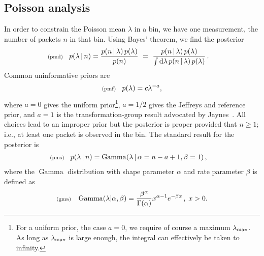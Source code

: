 \documentclass[11pt]{article}
\newcommand{\lleq}[1]{\label{#1} }
\renewcommand{\lleq}[1]{\label{#1} {\scriptstyle {\rm (#1)}} \hspace*{2ex} }
\newcommand{\cond}{\,|\,}
\DeclareMathOperator{\GammaDist}{Gamma}
\newcommand{\rmdx}[1]{\dd{#1}} %
\begin{document}
\subsection{Poisson analysis}

In order to constrain the Poisson mean $\lambda$ in a bin, we have one
measurement, the number of packets $n$ in that bin. Using Bayes' theorem, we find the posterior
\begin{align}
  \lleq{pmd}
  p(\lambda\cond n) %
  &= \frac{p(n\cond\lambda)\,p(\lambda)} {p(n)}
  \ =\ \frac{p(n\cond\lambda)\,p(\lambda)} %
  {\int \rmdx{\lambda} p(n\cond\lambda)\,p(\lambda)} \,.
\end{align}
Common uninformative priors are
\begin{align}
  \lleq{pmf}
  p(\lambda) = c \lambda^{-a},
\end{align}
where $a=0$ gives the uniform prior\footnote{For a uniform prior, the
  case $a{=}0$, we require of course a maximum $\lambda_{\rm max}$. As
  long as $\lambda_{\rm max}$ is large enough, the integral can
  effectively be taken to infinity.}, $a=1/2$ gives the Jeffreys and
reference prior, and $a=1$ is the transformation-group result
advocated by Jaynes~\cite[Ch. 12]{jaynes2003probability}. All choices
lead to an improper prior but the posterior is proper provided that
$n \ge 1$; i.e., at least one packet is observed in the bin. The
standard result for the posterior is
\begin{align}
  \lleq{pms}
  p(\lambda\cond n) &= \GammaDist(\lambda \cond \alpha = n-a+1, \beta = 1)\,,
\end{align}
where the  $\GammaDist$ distribution with shape parameter $\alpha$ and rate
parameter $\beta$ is defined as
\begin{align}
  \lleq{gma}
  \GammaDist(\lambda | \alpha, \beta) = \frac{\beta^\alpha}{\Gamma(\alpha)} x^{\alpha-1} e^{-\beta x}\, , \; x > 0 .
\end{align}
\end{document}
